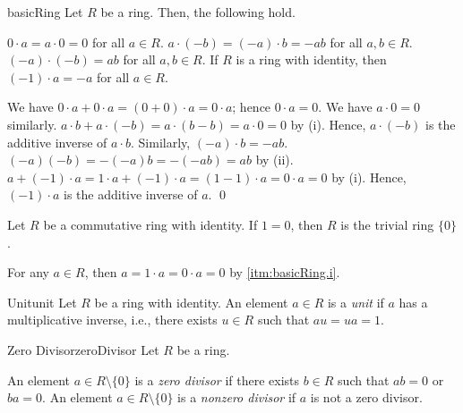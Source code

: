 \documentclass[../modern_algebra.tex]{subfiles}
\begin{document}
\begin{Theorem}{\textsf{}}{basicRing}
    Let \(R\) be a ring. Then, the following hold.
    \begin{enumerate}[nolistsep, label=(\roman*), ref=\protect{\Cref{th:basicRing} (\roman*)}]
        \ii\label{itm:basicRing.i}
        \(0 \cdot a = a \cdot 0 = 0\) for all \(a \in R\).
        \ii\label{itm:basicRing.ii}
        \(a \cdot (-b) = (-a) \cdot b = -ab\) for all \(a, b \in R\).
        \ii\label{itm:basicRing.iii}
        \((-a) \cdot (-b) = ab\) for all \(a, b \in R\).
        \ii\label{itm:basicRing.iv}
        If \(R\) is a ring with identity, then \((-1) \cdot a = -a\) for all \(a \in R\).
    \end{enumerate}
\end{Theorem}
\begin{myclaim}[Proof]\hfill
\begin{enumerate}[nolistsep, label=(\roman*), listparindent=\parindent]
    \ii
    We have \(0 \cdot a + 0 \cdot a = (0 + 0) \cdot a = 0 \cdot a\);
    hence \(0 \cdot a = 0\). We have \(a \cdot 0 = 0\) similarly.
    \ii
    \(a \cdot b + a \cdot (-b) = a \cdot (b - b) = a \cdot 0 = 0\) by (i).
    Hence, \(a \cdot (-b)\) is the additive inverse of \(a \cdot b\).
    Similarly, \((-a) \cdot b = -ab\).
    \ii
    \((-a)(-b) = -(-a)b = -(-ab) = ab\) by (ii).
    \ii
    \(a + (-1) \cdot a = 1 \cdot a + (-1) \cdot a = (1 - 1) \cdot a = 0 \cdot a = 0\) by (i).
    Hence, \((-1) \cdot a\) is the additive inverse of \(a\).
    \qed
\end{enumerate}
\end{myclaim}

\begin{Theorem}{\textsf{}}{}
    Let \(R\) be a commutative ring with identity.
    If \(1 = 0\), then \(R\) is the trivial ring \(\{0\}\).
\end{Theorem}
\begin{myproof}[Proof]
    For any \(a \in R\), then \(a = 1 \cdot a = 0 \cdot a = 0\) by \ref{itm:basicRing.i}.
\end{myproof}

\begin{Definition}[colbacktitle=red!75!black]{Unit}{unit}
    Let \(R\) be a ring with identity.
    An element \(a \in R\) is a \textit{unit} if \(a\) has a multiplicative inverse,
    i.e., there exists \(u \in R\) such that \(au = ua = 1\).
\end{Definition}

\begin{Definition}[colbacktitle=red!75!black]{Zero Divisor}{zeroDivisor}
    Let \(R\) be a ring.
    \begin{itemize}[nolistsep, leftmargin=*, listparindent=\parindent]
        \ii
        An element \(a \in R \setminus \{0\}\) is a \textit{zero divisor}
        if there exists \(b \in R\) such that \(ab = 0\) or \(ba = 0\).
        \ii
        An element \(a \in R \setminus \{0\}\) is a \textit{nonzero divisor}
        if \(a\) is not a zero divisor.
    \end{itemize}
\end{Definition}
\end{document}
